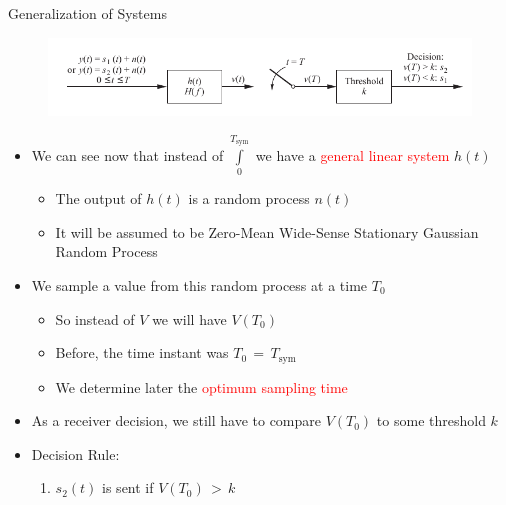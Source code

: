 \documentclass{Beamer}
\begin{document}
\begin{frame}[t,allowframebreaks]{Generalization of Systems}


\begin{figure}[h]
\centering
\includegraphics[scale=0.8]{Figures/Baseband_Binary/general_rx_binary}
\label{fig:Baseband_Binary:general_rx_binary}
\end{figure}


\begin{itemize}

\item We can see now that instead of $\displaystyle\int\limits_0^{T_{\text{sym}}}$ we have a \textcolor{red}{general linear system} $h(t)$

	\begin{itemize}
	\item The output of $h(t)$ is a random process $n(t)$
	
	\item It will be assumed to be Zero-Mean Wide-Sense Stationary Gaussian Random Process
	\end{itemize}

\item We sample a value from this random process at a time $T_0$

	\begin{itemize}
	
	\item So instead of $V$ we will have $V(T_0)$	
	
	\item Before, the time instant was $T_0 \, = \, T_{\text{sym}}$
	
	\item We determine later the \textcolor{red}{optimum sampling time}
	\end{itemize}


\newpage

\item As a receiver decision, we still have to compare $V(T_0)$ to some threshold $k$

\item Decision Rule:

	\begin{enumerate}
	\item $s_2(t)$ is sent if $V(T_0) \, > \, k$
	

\end{enumerate}
\end{itemize}
\end{frame}
\end{document}

